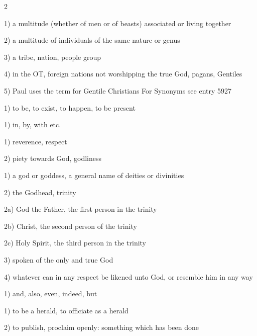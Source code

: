 \documentclass[letterpaper]{article}
\begin{document}
\begin{multicols}{2}
\begin{description}
1) a multitude (whether of men or of beasts) associated or
living together

2) a multitude of individuals of the same nature or genus

3) a tribe, nation, people group

4) in the OT, foreign nations not worshipping the true God, pagans,
Gentiles

5) Paul uses the term for Gentile Christians
For Synonyms see entry 5927



\item[1510: ]



1) to be, to exist, to happen, to be present



\item[1722: ]



1) in, by, with etc.



\item[2150: ]



1) reverence, respect

2) piety towards God, godliness



\item[2316: ]


1) a god or goddess, a general name of deities or divinities

2) the Godhead, trinity

2a) God the Father, the first person in the trinity

2b) Christ, the second person of the trinity

2c) Holy Spirit, the third person in the trinity

3) spoken of the only and true God

4) whatever can in any respect be likened unto God, or resemble him in
any way


\item[2532: ]



1) and, also, even, indeed, but



\item[2784: ]



1) to be a herald, to officiate as a herald

2) to publish, proclaim openly: something which has been done


\end{description}
\end{multicols}
\end{document}
